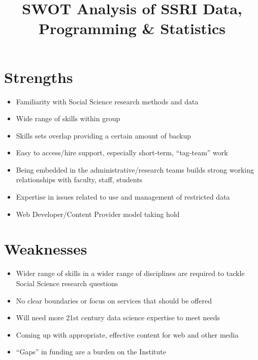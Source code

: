 \documentclass{article}
\begin{document}

\title{SWOT Analysis of SSRI Data, Programming \& Statistics}
\maketitle
\section*{Strengths}
\begin{itemize}
  \item Familiarity with Social Science research methods and data
  \item Wide range of skills within group
  \item Skills sets overlap providing a certain amount of backup 
  \item Easy to access/hire support, especially short-term, ``tag-team'' work 
  \item Being embedded in the administrative\slash research teams builds strong working relationships with faculty, staff, students
  \item Expertise in issues related to use and management of restricted data
  \item Web Developer/Content Provider model taking hold
\end{itemize}  
\section*{Weaknesses}
\begin{itemize}
  \item Wider range of skills in a wider range of disciplines are required to tackle Social Science research questions 
  \item No clear boundaries or focus on services that should be offered 
  \item Will need more 21st century data science expertise to meet needs
  \item Coming up with appropriate, effective content for web and other media
  \item ``Gaps'' in funding are a burden on the Institute 
\end{itemize}
\end{document}
